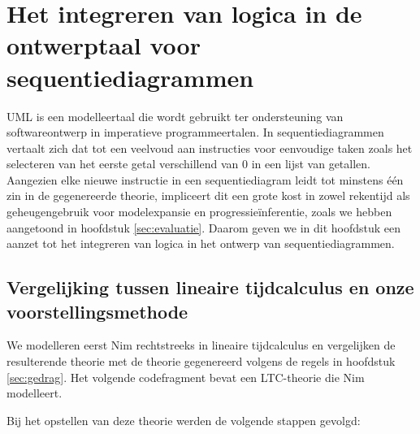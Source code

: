\chapter{Het integreren van logica in de ontwerptaal voor sequentiediagrammen}\label{sec:decl-seq}
UML is een modelleertaal die wordt gebruikt ter ondersteuning van softwareontwerp in imperatieve programmeertalen. In sequentiediagrammen vertaalt zich dat tot een veelvoud aan instructies voor eenvoudige taken zoals het selecteren van het eerste getal verschillend van 0 in een lijst van getallen. Aangezien elke nieuwe instructie in een sequentiediagram leidt tot minstens \'e\'en zin in de gegenereerde theorie, impliceert dit een grote kost in zowel rekentijd als geheugengebruik voor modelexpansie en progressie\"inferentie, zoals we hebben aangetoond in hoofdstuk \ref{sec:evaluatie}. Daarom geven we in dit hoofdstuk een aanzet tot het integreren van logica in het ontwerp van sequentiediagrammen.

\section{Vergelijking tussen lineaire tijdcalculus en onze voorstellingsmethode}

We modelleren eerst Nim rechtstreeks in lineaire tijdcalculus en vergelijken de resulterende theorie met de theorie gegenereerd volgens de regels in hoofdstuk \ref{sec:gedrag}. Het volgende codefragment bevat een LTC-theorie die Nim modelleert. 

\label{code:ltc-nim}

Bij het opstellen van deze theorie werden de volgende stappen gevolgd:

